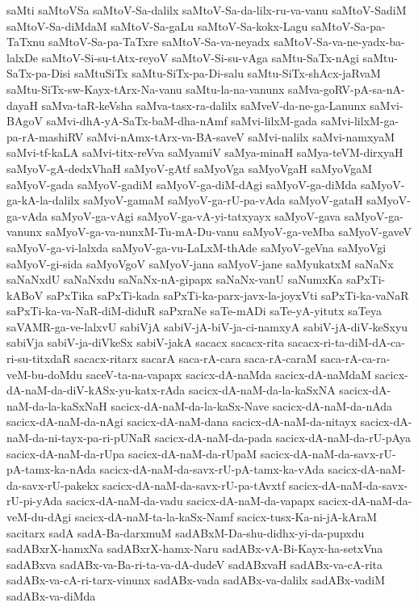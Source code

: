 {saMti
saMtoVSa
saMtoV-Sa-dalilx
saMtoV-Sa-da-lilx-ru-va-vanu
saMtoV-SadiM
saMtoV-Sa-diMdaM
saMtoV-Sa-gaLu
saMtoV-Sa-kokx-Lagu
saMtoV-Sa-pa-TaTxnu
saMtoV-Sa-pa-TaTxre
saMtoV-Sa-va-neyadx
saMtoV-Sa-va-ne-yadx-ba-lalxDe
saMtoV-Si-su-tAtx-reyoV
saMtoV-Si-su-vAga
saMtu-SaTx-nAgi
saMtu-SaTx-pa-Disi
saMtuSiTx
saMtu-SiTx-pa-Di-salu
saMtu-SiTx-shAcx-jaRvaM
saMtu-SiTx-sw-Kayx-tArx-Na-vanu
saMtu-la-na-vanunx
saMva-goRV-pA-sa-nA-dayaH
saMva-taR-keVsha
saMva-tasx-ra-dalilx
saMveV-da-ne-ga-Lanunx
saMvi-BAgoV
saMvi-dhA-yA-SaTx-baM-dha-nAmf
saMvi-lilxM-gada
saMvi-lilxM-ga-pa-rA-mashiRV
saMvi-nAmx-tArx-va-BA-saveV
saMvi-nalilx
saMvi-namxyaM
saMvi-tf-kaLA
saMvi-titx-reVva
saMyamiV
saMya-minaH
saMya-teVM-dirxyaH
saMyoV-gA-dedxVhaH
saMyoV-gAtf
saMyoVga
saMyoVgaH
saMyoVgaM
saMyoV-gada
saMyoV-gadiM
saMyoV-ga-diM-dAgi
saMyoV-ga-diMda
saMyoV-ga-kA-la-dalilx
saMyoV-gamaM
saMyoV-ga-rU-pa-vAda
saMyoV-gataH
saMyoV-ga-vAda
saMyoV-ga-vAgi
saMyoV-ga-vA-yi-tatxyayx
saMyoV-gava
saMyoV-ga-vanunx
saMyoV-ga-va-nunxM-Tu-mA-Du-vanu
saMyoV-ga-veMba
saMyoV-gaveV
saMyoV-ga-vi-lalxda
saMyoV-ga-vu-LaLxM-thAde
saMyoV-geVna
saMyoVgi
saMyoV-gi-sida
saMyoVgoV
saMyoV-jana
saMyoV-jane
saMyukatxM
saNaNx
saNaNxdU
saNaNxdu
saNaNx-nA-gipapx
saNaNx-vanU
saNumxKa
saPxTi-kABoV
saPxTika
saPxTi-kada
saPxTi-ka-parx-javx-la-joyxVti
saPxTi-ka-vaNaR
saPxTi-ka-va-NaR-diM-diduR
saPxraNe
saTe-mADi
saTe-yA-yitutx
saTeya
saVAMR-ga-ve-lalxvU
sabiVjA
sabiV-jA-biV-ja-ci-namxyA
sabiV-jA-diV-keSxyu
sabiVja
sabiV-ja-diVkeSx
sabiV-jakA
sacacx
sacacx-rita
sacacx-ri-ta-diM-dA-ca-ri-su-titxdaR
sacacx-ritarx
sacarA
saca-rA-cara
saca-rA-caraM
saca-rA-ca-ra-veM-bu-doMdu
saceV-ta-na-vapapx
sacicx-dA-naMda
sacicx-dA-naMdaM
sacicx-dA-naM-da-diV-kASx-yu-katx-rAda
sacicx-dA-naM-da-la-kaSxNA
sacicx-dA-naM-da-la-kaSxNaH
sacicx-dA-naM-da-la-kaSx-Nave
sacicx-dA-naM-da-nAda
sacicx-dA-naM-da-nAgi
sacicx-dA-naM-dana
sacicx-dA-naM-da-nitayx
sacicx-dA-naM-da-ni-tayx-pa-ri-pUNaR
sacicx-dA-naM-da-pada
sacicx-dA-naM-da-rU-pAya
sacicx-dA-naM-da-rUpa
sacicx-dA-naM-da-rUpaM
sacicx-dA-naM-da-savx-rU-pA-tamx-ka-nAda
sacicx-dA-naM-da-savx-rU-pA-tamx-ka-vAda
sacicx-dA-naM-da-savx-rU-pakekx
sacicx-dA-naM-da-savx-rU-pa-tAvxtf
sacicx-dA-naM-da-savx-rU-pi-yAda
sacicx-dA-naM-da-vadu
sacicx-dA-naM-da-vapapx
sacicx-dA-naM-da-veM-du-dAgi
sacicx-dA-naM-ta-la-kaSx-Namf
sacicx-tusx-Ka-ni-jA-kAraM
sacitarx
sadA
sadA-Ba-darxmuM
sadABxM-Da-shu-didhx-yi-da-pupxdu
sadABxrX-hamxNa
sadABxrX-hamx-Naru
sadABx-vA-Bi-Kayx-ha-setxVna
sadABxva
sadABx-va-Ba-ri-ta-va-dA-dudeV
sadABxvaH
sadABx-va-cA-rita
sadABx-va-cA-ri-tarx-vinunx
sadABx-vada
sadABx-va-dalilx
sadABx-vadiM
sadABx-va-diMda
}
